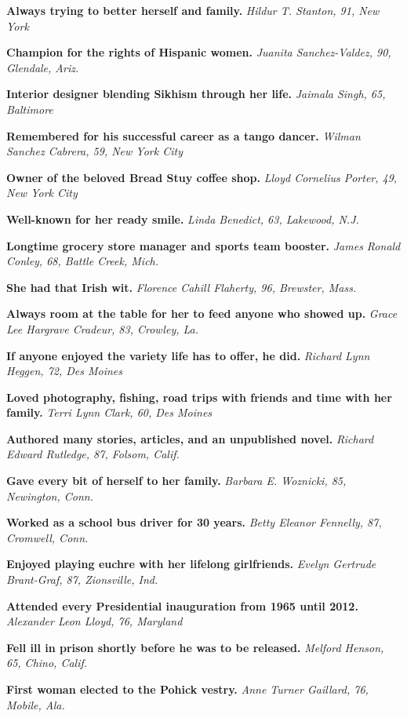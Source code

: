 \textbf{Always trying to better herself and family.} \emph{Hildur T.
Stanton, 91, New York}

\textbf{Champion for the rights of Hispanic women.} \emph{Juanita
Sanchez-Valdez, 90, Glendale, Ariz.}

\textbf{Interior designer blending Sikhism through her life.}
\emph{Jaimala Singh, 65, Baltimore}

\textbf{Remembered for his successful career as a tango dancer.}
\emph{Wilman Sanchez Cabrera, 59, New York City}

\textbf{Owner of the beloved Bread Stuy coffee shop.} \emph{Lloyd
Cornelius Porter, 49, New York City}

\textbf{Well-known for her ready smile.} \emph{Linda Benedict, 63,
Lakewood, N.J.}

\textbf{Longtime grocery store manager and sports team booster.}
\emph{James Ronald Conley, 68, Battle Creek, Mich.}

\textbf{She had that Irish wit.} \emph{Florence Cahill Flaherty, 96,
Brewster, Mass.}

\textbf{Always room at the table for her to feed anyone who showed up.}
\emph{Grace Lee Hargrave Cradeur, 83, Crowley, La.}

\textbf{If anyone enjoyed the variety life has to offer, he did.}
\emph{Richard Lynn Heggen, 72, Des Moines}

\textbf{Loved photography, fishing, road trips with friends and time
with her family.} \emph{Terri Lynn Clark, 60, Des Moines}

\textbf{Authored many stories, articles, and an unpublished novel.}
\emph{Richard Edward Rutledge, 87, Folsom, Calif.}

\textbf{Gave every bit of herself to her family.} \emph{Barbara E.
Woznicki, 85, Newington, Conn.}

\textbf{Worked as a school bus driver for 30 years.} \emph{Betty Eleanor
Fennelly, 87, Cromwell, Conn.}

\textbf{Enjoyed playing euchre with her lifelong girlfriends.}
\emph{Evelyn Gertrude Brant-Graf, 87, Zionsville, Ind.}

\textbf{Attended every Presidential inauguration from 1965 until 2012.}
\emph{Alexander Leon Lloyd, 76, Maryland}

\textbf{Fell ill in prison shortly before he was to be released.}
\emph{Melford Henson, 65, Chino, Calif.}

\textbf{First woman elected to the Pohick vestry.} \emph{Anne Turner
Gaillard, 76, Mobile, Ala.}

